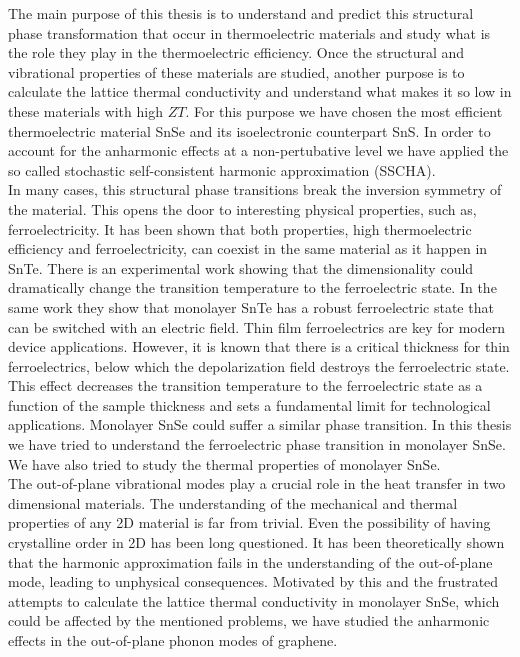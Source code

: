 The main purpose of this thesis is to understand and predict this structural phase transformation that occur in 
thermoelectric materials and study what is the role they play in the thermoelectric efficiency. Once the structural 
and vibrational properties of these materials are studied, another purpose is to calculate the lattice thermal 
conductivity and understand what makes it so low in these materials with high $ZT$. For this purpose we have chosen 
the most efficient thermoelectric material SnSe and its isoelectronic counterpart SnS. In order to account for the 
anharmonic effects at a non-pertubative level we have applied the so called stochastic self-consistent harmonic 
approximation\cite{errea2013first,errea2014anharmonic,bianco2017second,monacelli2018pressure} (SSCHA). \\

In many cases, this structural phase transitions break the inversion symmetry of the 
material\cite{ribeiro2018strong,chang2016discovery}. This opens the door to interesting physical properties, such 
as, ferroelectricity. It has been shown that both properties, high thermoelectric efficiency and ferroelectricity, 
can coexist in the same material as it happen in SnTe\cite{ribeiro2018strong,zhang2013high}. There is an 
experimental work\cite{chang2016discovery} showing that the dimensionality could dramatically change the transition 
temperature to the ferroelectric state. In the same work\cite{chang2016discovery} they show that 
monolayer SnTe has a robust ferroelectric state that can be switched with an electric field. Thin film ferroelectrics 
are key for modern device applications\cite{lallart2011ferroelectrics}. However, it is known that there is a critical 
thickness for thin ferroelectrics, below which the depolarization field destroys the ferroelectric 
state\cite{batra1973new,zhong1994giant,dawber2005physics}. This effect decreases the transition temperature to the 
ferroelectric state as a function of the sample thickness\cite{fong2004ferroelectricity,fong2006stabilization} and 
sets a fundamental limit for technological applications. Monolayer SnSe could suffer a similar phase transition. In 
this thesis we have tried to understand the ferroelectric phase transition in monolayer 
SnSe\cite{chang2020controlled}. We have also tried to study the thermal properties of monolayer SnSe. \\

The out-of-plane vibrational modes play a crucial role in the heat transfer in two dimensional materials. 
The understanding of the mechanical and thermal properties of any 2D material is far from trivial. Even the 
possibility of having crystalline order in 2D has been long 
questioned\cite{landau_statistical_physics,mermin1968crystalline}. It has been theoretically shown that the harmonic 
approximation fails in the understanding of the out-of-plane mode, leading to unphysical consequences. Motivated by 
this and the frustrated attempts to calculate the lattice thermal conductivity in monolayer SnSe, which could be 
affected by the mentioned problems, we have studied the anharmonic effects in the out-of-plane phonon modes of 
graphene. \\


